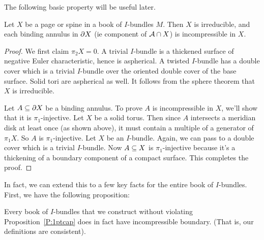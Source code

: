 The following basic property will be useful later.

\begin{prop}\label{P:pagespineII}

Let $X$ be a page or spine in a book of $I$-bundles $M$. Then $X$ is
irreducible, and each binding annulus in $\partial X$ (ie component of $\mathcal{A} \cap X$)
is incompressible in $X$.

\end{prop}

\begin{proof}

We first claim $\pi_2X = 0$. A trivial $I$-bundle is a thickened surface of
negative Euler characteristic, hence is aspherical. A twisted $I$-bundle has
a double cover which is a trivial $I$-bundle over the oriented double cover of
the base surface. Solid tori are aspherical as well. It follows from the sphere
theorem that $X$ is irreducible.

Let $A \subseteq \partial X$ be a binding annulus. To prove $A$ is incompressible in $X$,
we'll show that it is $\pi_1$-injective. Let $X$ be a solid torus. Then since
$A$ intersects a meridian disk at least once (as shown above), it must contain
a multiple of a generator of $\pi_1X$. So $A$ is $\pi_1$-injective. Let $X$ be
an $I$-bundle. Again, we can pass to a double cover which is a trivial
$I$-bundle.  Now $A \subseteq X$ is $\pi_1$-injective because it's a thickening of
a boundary component of a compact surface. This completes the proof.

\end{proof}

In fact, we can extend this to a few key facts for the entire book of
$I$-bundles. First, we have the following proposition:

\begin{prop}\label{P:boibincomp}

Every book of $I$-bundles that we construct without violating
Proposition~\ref{P:1ptcap} does in fact have incompressible boundary. (That is,
our definitions are consistent).

\end{prop}

